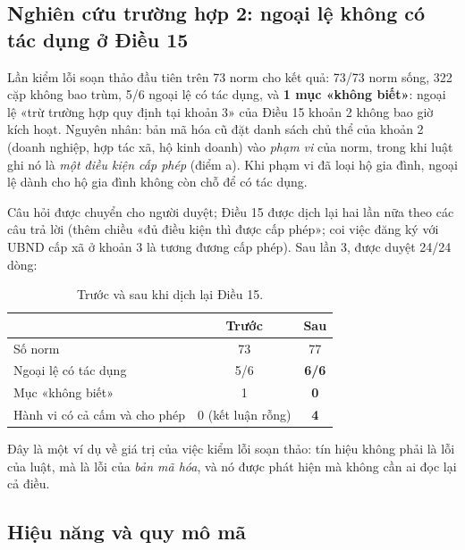 \documentclass[12pt,a4paper]{article}
\begin{document}
\subsection{Nghiên cứu trường hợp 2: ngoại lệ không có tác dụng ở Điều 15}

Lần kiểm lỗi soạn thảo đầu tiên trên 73 norm cho kết quả: 73/73 norm sống, 322 cặp không bao trùm, 5/6 ngoại lệ có tác dụng,
và \textbf{1 mục «không biết»}: ngoại lệ «trừ trường hợp quy định tại khoản 3» của Điều 15 khoản 2 không bao giờ kích hoạt.
Nguyên nhân: bản mã hóa cũ đặt danh sách chủ thể của khoản 2 (doanh nghiệp, hợp tác xã, hộ kinh doanh) vào \emph{phạm vi} của
norm, trong khi luật ghi nó là \emph{một điều kiện cấp phép} (điểm a). Khi phạm vi đã loại hộ gia đình, ngoại lệ dành cho hộ
gia đình không còn chỗ để có tác dụng.

Câu hỏi được chuyển cho người duyệt; Điều 15 được dịch lại hai lần nữa theo các câu trả lời (thêm chiều «đủ điều kiện thì được
cấp phép»; coi việc đăng ký với UBND cấp xã ở khoản 3 là tương đương cấp phép). Sau lần 3, được duyệt 24/24 dòng:

\begin{table}[H]
\centering\small
\caption{Trước và sau khi dịch lại Điều 15.}
\begin{tabular}{lcc}
\toprule
 & Trước & Sau\\
\midrule
Số norm & 73 & 77\\
Ngoại lệ có tác dụng & 5/6 & \textbf{6/6}\\
Mục «không biết» & 1 & \textbf{0}\\
Hành vi có cả cấm và cho phép & 0 (kết luận rỗng) & \textbf{4}\\
\bottomrule
\end{tabular}
\end{table}

Đây là một ví dụ về giá trị của việc kiểm lỗi soạn thảo: tín hiệu không phải là lỗi của luật, mà là lỗi của \emph{bản mã hóa},
và nó được phát hiện mà không cần ai đọc lại cả điều.

\subsection{Hiệu năng và quy mô mã}
\end{document}
